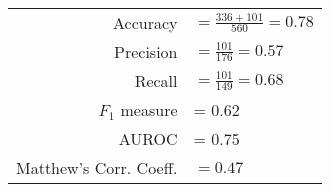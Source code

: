 \begin{tabular}{rl}
\rule{0pt}{12pt} Accuracy & $= \frac{336 + 101}{560} = 0.78$  \tabularnewline
\rule{0pt}{12pt} Precision & $= \frac{101}{176} = 0.57$ \tabularnewline
\rule{0pt}{12pt} Recall & $= \frac{101}{149} = 0.68$  \tabularnewline
\rule{0pt}{12pt} $F_1$ measure &= 0.62 \tabularnewline
\rule{0pt}{12pt} AUROC &= 0.75 \tabularnewline
\rule{0pt}{12pt} Matthew's Corr. Coeff.} & $= 0.47$ \tabularnewline
\end{tabular}
